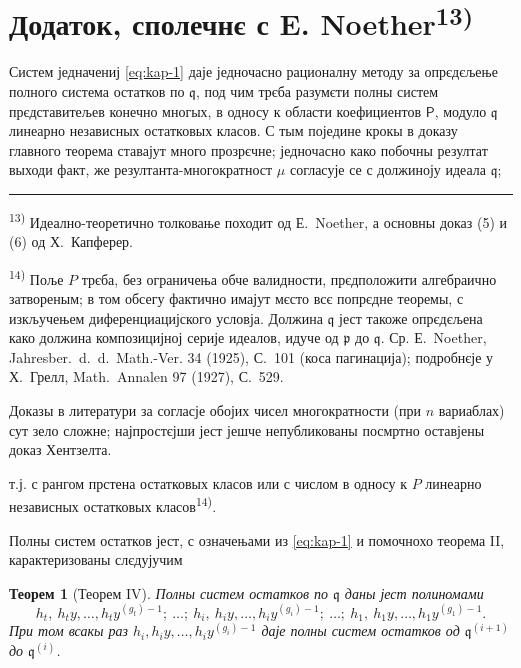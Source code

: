 \documentclass[11pt]{article}
\newcommand{\foreign}[1]{#1}
\theoremstyle{plain}
\newtheorem{satz}{Теорем}
\begin{document}
\newpage
\section*{Додаток, сполечнє с E. Noether\textsuperscript{13)}}

Систем једначениј \eqref{eq:kap-1} даје једночасно рационалну
методу за опрєдєљење полного система остатков по $\mathfrak{q}$,
под чим трєба разумєти полны систем прєдставитељев конечно многых,
в односу к области коефициентов $\mathsf{P}$, модуло $\mathfrak{q}$ линеарно
независных остатковых класов. С тым поједине крокы в доказу
главного теорема ставајут много прозрєчне; једночасно како
побочны резултат выходи факт, же резултанта-многократност $\mu$
согласује се с должиноју идеала $\mathfrak{q}$;

\vspace{0.5em}
\noindent\rule{\textwidth}{0.4pt}
\vspace{0.3em}

{\footnotesize
\textsuperscript{13)} Идеално-теоретично толковање походит од Е.\ Noether, а основны
доказ (5) и (6) од Х.\ Капферер.

\textsuperscript{14)} Поље $P$ трєба, без ограничења обче валидности, прєдположити
алгебраично затвореным; в том обсегу фактично имајут мєсто всє попрєдне
теоремы, с изкључењем диференциацијского условја. Должина
$\mathfrak{q}$ јест такоже опрєдєљена како должина композицијној
серије идеалов, идуче од $\mathfrak{p}$ до $\mathfrak{q}$. Ср.
Е.\ Noether, \foreign{Jahresber.\ d.\ d.\ Math.-Ver.} 34 (1925), С.~101
(коса пагинација); подробнєје у Х.\ Грелл, \foreign{Math.\ Annalen} 97
(1927), С.~529.

Доказы в литератури за согласје обојих чисел многократности (при
$n$ вариаблах) сут зело сложне; најпростєјши јест јешче непубликованы
посмртно оставјены доказ Хентзелта.
}

\vspace{1em}
т.ј. с рангом прстена остатковых класов или с числом в односу к $P$
линеарно независных остатковых класов\textsuperscript{14)}.

Полны систем остатков јест, с означењами из \eqref{eq:kap-1} и
помочнохо теорема II, карактеризованы слєдујучим

\begin{satz}[Теорем IV]\label{satz:kap-IV}
Полны систем остатков по $\mathfrak{q}$ даны јест полиномами
\[
h_{t},\ h_{t}y,\ldots,h_{t}y^{(g_{t})-1};\ \ldots;\
h_{i},\ h_{i}y,\ldots,h_{i}y^{(g_{i})-1};\ \ldots;\
h_{1},\ h_{1}y,\ldots,h_{1}y^{(g_{1})-1}.
\]
При том всакы раз
$h_{i}, h_{i}y, \ldots, h_{i}y^{(g_{i})-1}$ даје полны
систем остатков од $\mathfrak{q}^{(i+1)}$ до
$\mathfrak{q}^{(i)}$.
\end{satz}
\end{document}
